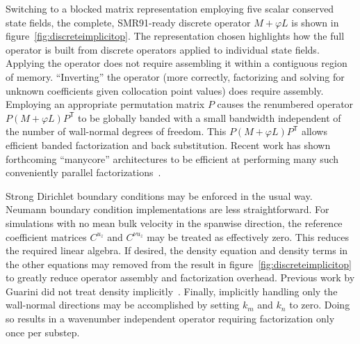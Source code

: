\documentclass[letterpaper,11pt,nointlimits,reqno,draft]{amsart}
\newcommand{\trans}[1]{{#1}^{\ensuremath{\mathsf{T}}}}
\begin{document}
Switching to a blocked matrix representation employing five scalar conserved
state fields, the complete, SMR91-ready discrete operator $M+\varphi{}L$ is
shown in figure~\vref{fig:discreteimplicitop}.  The representation chosen
highlights how the full operator is built from discrete operators applied to
individual state fields.  Applying the operator does not require assembling it
within a contiguous region of memory.  ``Inverting'' the operator (more
correctly, factorizing and solving for unknown coefficients given collocation
point values) does require assembly.  Employing an appropriate permutation
matrix $P$ causes the renumbered operator $P\left(M+\varphi{}L\right)\trans{P}$
to be globally banded with a small bandwidth independent of the number of
wall-normal degrees of freedom.  This $P\left(M+\varphi{}L\right)\trans{P}$
allows efficient banded factorization and back substitution.  Recent work has
shown forthcoming ``manycore'' architectures to be efficient at performing many
such conveniently parallel factorizations~\cite{Schulz2012Early}.

Strong Dirichlet boundary conditions may be enforced in the usual way.  Neumann
boundary condition implementations are less straightforward.  For simulations
with no mean bulk velocity in the spanwise direction, the reference coefficient
matrices $C^{u_z}$ and $C^{\nu{}u_z}$ may be treated as effectively zero.  This
reduces the required linear algebra.  If desired, the density equation and
density terms in the other equations may removed from the result in
figure~\ref{fig:discreteimplicitop} to greatly reduce operator assembly and
factorization overhead.  Previous work by Guarini did not treat density
implicitly~\cite{Guarini1998}.  Finally, implicitly handling only the
wall-normal directions may be accomplished by setting $k_{m}$ and $k_{n}$ to
zero.  Doing so results in a wavenumber independent operator requiring
factorization only once per substep.
\end{document}
